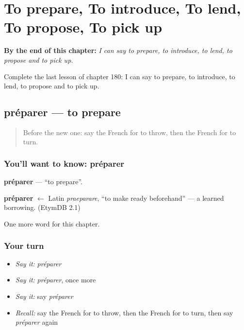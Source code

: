 
\chapter{To prepare, To introduce, To lend, To propose, To pick up}
\label{ch:fr-to-prepare-to-introduce-to-lend-to-propose-to-pick-up}

\begin{chapteropening}
\textbf{By the end of this chapter:} \emph{I can say to prepare, to introduce, to lend, to propose and to pick up.}

Complete the last lesson of chapter 180: I can say to prepare, to introduce, to lend, to propose and to pick up.
\end{chapteropening}

\section[préparer]{préparer — to prepare}

\label{lesson:FR-C180-preparer}



\begin{quote}
Before the new one: say the French for to throw, then the French for to turn.
\end{quote}

\subsection*{You'll want to know: préparer}
\textbf{préparer} — \textquotedblleft{}to prepare\textquotedblright{}.

\begin{cousinweb}
\textbf{préparer} $\leftarrow$ Latin \emph{praeparare}, \textquotedblleft{}to make ready beforehand\textquotedblright{} — a learned borrowing. (EtymDB 2.1)
\end{cousinweb}

\begin{grammarlens}[title={What you've built}]
One more word for this chapter.
\end{grammarlens}

\subsection*{Your turn}
\begin{itemize}
\raggedright
  \item \emph{Say it:} \emph{préparer}
  \item \emph{Say it:} \emph{préparer}, once more
  \item \emph{Say it:} say \emph{préparer}
  \item \emph{Recall:} say the French for to throw, then the French for to turn, then say \emph{préparer} again
\end{itemize}

